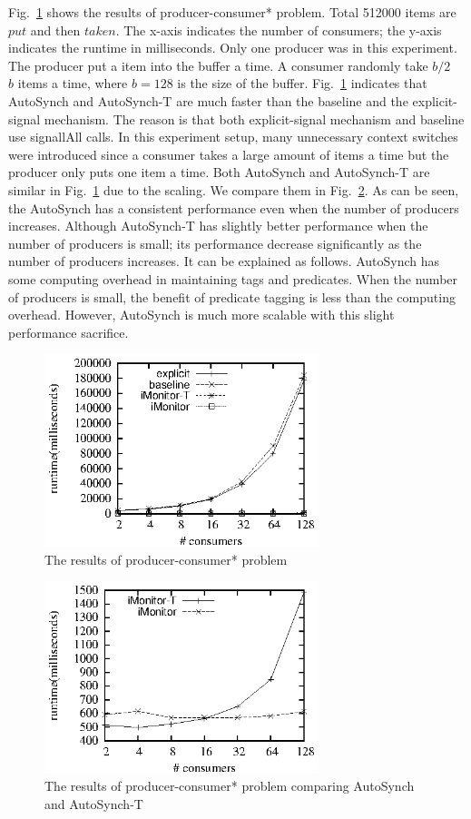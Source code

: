 \documentclass[preprint]{sigplanconf}
\begin{document}
Fig.~\ref{fig:rpc_eval} shows the results of producer-consumer* problem. Total
512000 items are $put$ and then $taken$. The x-axis indicates the number of 
consumers; the y-axis indicates the runtime in milliseconds. Only one producer
was in this experiment. The producer put a item into the buffer a time. A 
consumer randomly take $b/2$ ~ $b$ items a time, where $b = 128$ is the size of 
the buffer. Fig.~\ref{fig:rpc_eval} indicates that AutoSynch and AutoSynch-T are
much faster than the baseline and the explicit-signal mechanism. The reason is
that both explicit-signal mechanism and baseline use signallAll calls. In this
experiment setup, many unnecessary context switches were introduced since a
consumer takes a large amount of items a time but the producer only puts one
item a time. Both AutoSynch and AutoSynch-T are similar in
Fig.~\ref{fig:rpc_eval} due to the scaling. We compare them in
Fig.~\ref{fig:rpch_eval}. As can be seen, the AutoSynch has a consistent
performance even when the number of producers increases. Although AutoSynch-T has
slightly better performance when the number of producers is small; its 
performance decrease significantly as the number of producers increases. It can
be explained as follows. AutoSynch has some computing overhead in maintaining 
tags and predicates. When the number of producers is small, the benefit of
predicate tagging is less than the computing overhead. However, AutoSynch is
much more scalable with this slight performance sacrifice.

\begin{figure}[ht!]
  \centering
  \includegraphics[width=80mm]{fig/rpc.eps}
  \caption{The results of producer-consumer* problem}
  \label{fig:rpc_eval}
\end{figure}

\begin{figure}[ht!]
  \centering
  \includegraphics[width=80mm]{fig/rpch.eps}
  \caption{The results of producer-consumer* problem comparing AutoSynch and
  AutoSynch-T}
  \label{fig:rpch_eval}
\end{figure}
\end{document}
